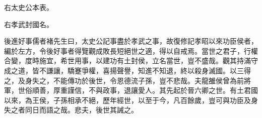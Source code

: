 右太史公本表。


右孝武封國名。

後進好事儒者褚先生曰，太史公記事盡於孝武之事，故復修記孝昭以來功臣侯者，編於左方，令後好事者得覽觀成敗長短絕世之適，得以自戒焉。當世之君子，行權合變，度時施宜，希世用事，以建功有土封侯，立名當世，豈不盛哉。觀其持滿守成之道，皆不謙讓，驕蹇爭權，喜揚聲譽，知進不知退，終以殺身滅國。以三得之，及身失之，不能傳功於後世，令恩德流子孫，豈不悲哉。夫龍雒侯曾為前將軍，世俗順善，厚重謹信，不與政事，退讓愛人。其先起於晉六卿之世。有土君國以來，為王侯，子孫相承不絕，歷年經世，以至于今，凡百餘歲，豈可與功臣及身失之者同日而語之哉。悲夫，後世其誡之。

